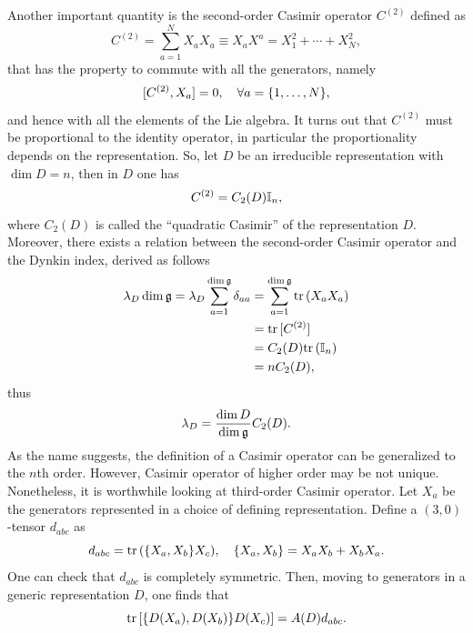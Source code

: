 Another important quantity is the second-order Casimir operator $C^{(2)}$ defined as
\begin{equation}
    C^{(2)} = \sum_{a=1}^NX_aX_a \equiv X_aX^a = X_1^2 + \cdots + X_N^2,
\end{equation}
that has the property to commute with all the generators, namely
\begin{equation}
    [C^{(2)},X_a] = 0,\quad \forall a = \{1,\dots,N\},
\end{equation}
and hence with all the elements of the Lie algebra. It turns out that $C^{(2)}$ must be proportional to the identity operator, in particular the proportionality depends on the representation. So, let $D$ be an irreducible representation with $\dim{D} = n$, then in $D$ one has
\begin{equation}
    C^{(2)} = C_2(D)\mathbb{I}_n,
\end{equation}
where $C_2(D)$ is called the ``quadratic Casimir'' of the representation $D$. Moreover, there exists a relation between the second-order Casimir operator and the Dynkin index, derived as follows
\begin{equation}
    \begin{split}
        \lambda_D\dim{\mathfrak{g}} = \lambda_D\sum_{a=1}^{\dim{\mathfrak{g}}}\delta_{aa} &= \sum_{a=1}^{\dim{\mathfrak{g}}}\mathrm{tr}\,{(X_aX_a)} \\
        &= \mathrm{tr}\,{[C^{(2)}]} \\
        &= C_2(D)\mathrm{tr}\,{(\mathbb{I}_n)} \\
        &= nC_2(D),
    \end{split}
\end{equation}
thus 
\begin{equation}
    \lambda_D = \frac{\dim{D}}{\dim{\mathfrak{g}}}C_2(D).
\end{equation}
As the name suggests, the definition of a Casimir operator can be generalized to the $n$th order. However, Casimir operator of higher order may be not unique. Nonetheless, it is worthwhile looking at third-order Casimir operator. Let $X_a$ be the generators represented in a choice of defining representation. Define a $(3,0)$-tensor $d_{abc}$ as
\begin{equation}
    d_{abc} = \mathrm{tr}\,{(\{X_a,X_b\}X_c)},\quad \{X_a,X_b\} = X_aX_b + X_bX_a.
\end{equation}
One can check that $d_{abc}$ is completely symmetric. Then, moving to generators in a generic representation $D$, one finds that
\begin{equation}
\label{eq: anomaly of a representation}
    \mathrm{tr}\,{[\{D(X_a),D(X_b)\}D(X_c)]} = A(D)d_{abc}.
\end{equation}
